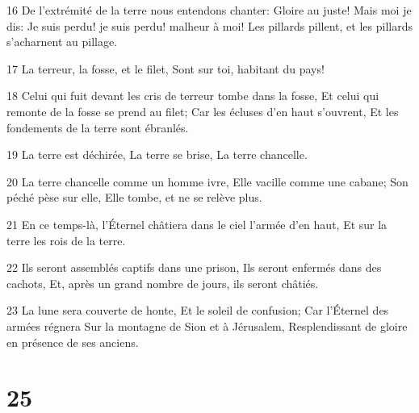 \par 16 De l'extrémité de la terre nous entendons chanter: Gloire au juste! Mais moi je dis: Je suis perdu! je suis perdu! malheur à moi! Les pillards pillent, et les pillards s'acharnent au pillage.
\par 17 La terreur, la fosse, et le filet, Sont sur toi, habitant du pays!
\par 18 Celui qui fuit devant les cris de terreur tombe dans la fosse, Et celui qui remonte de la fosse se prend au filet; Car les écluses d'en haut s'ouvrent, Et les fondements de la terre sont ébranlés.
\par 19 La terre est déchirée, La terre se brise, La terre chancelle.
\par 20 La terre chancelle comme un homme ivre, Elle vacille comme une cabane; Son péché pèse sur elle, Elle tombe, et ne se relève plus.
\par 21 En ce temps-là, l'Éternel châtiera dans le ciel l'armée d'en haut, Et sur la terre les rois de la terre.
\par 22 Ils seront assemblés captifs dans une prison, Ils seront enfermés dans des cachots, Et, après un grand nombre de jours, ils seront châtiés.
\par 23 La lune sera couverte de honte, Et le soleil de confusion; Car l'Éternel des armées régnera Sur la montagne de Sion et à Jérusalem, Resplendissant de gloire en présence de ses anciens.

\chapter{25}

